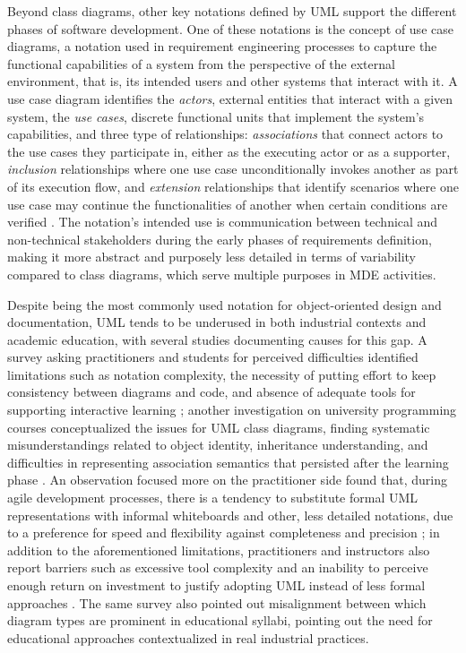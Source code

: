 Beyond class diagrams, other key notations defined by UML support the different phases of software development. One of these notations is the concept of use case diagrams, a notation used in requirement engineering processes to capture the functional capabilities of a system from the perspective of the external environment, that is, its intended users and other systems that interact with it. A use case diagram identifies the \textit{actors}, external entities that interact with a given system, the \textit{use cases}, discrete functional units that implement the system's capabilities, and three type of relationships: \textit{associations} that connect actors to the use cases they participate in, either as the executing actor or as a supporter, \textit{inclusion} relationships where one use case unconditionally invokes another as part of its execution flow, and \textit{extension} relationships that identify scenarios where one use case may continue the functionalities of another when certain conditions are verified \cite{fowler2003uml}. The notation's intended use is communication between technical and non-technical stakeholders during the early phases of requirements definition, making it more abstract and purposely less detailed in terms of variability compared to class diagrams, which serve multiple purposes in MDE activities.

Despite being the most commonly used notation for object-oriented design and documentation, UML tends to be underused in both industrial contexts and academic education, with several studies documenting causes for this gap. A survey asking practitioners and students for perceived difficulties identified limitations such as notation complexity, the necessity of putting effort to keep consistency between diagrams and code, and absence of adequate tools for supporting interactive learning \cite{siau2006identifying}; another investigation on university programming courses conceptualized the issues for UML class diagrams, finding systematic misunderstandings related to object identity, inheritance understanding, and difficulties in representing association semantics that persisted after the learning phase \cite{boustedt2012students}. An observation focused more on the practitioner side found that, during agile development processes, there is a tendency to substitute formal UML representations with informal whiteboards and other, less detailed notations, due to a preference for speed and flexibility against completeness and precision \cite{stettina2012documentation}; in addition to the aforementioned limitations, practitioners and instructors also report barriers such as excessive tool complexity and an inability to perceive enough return on investment to justify adopting UML instead of less formal approaches \cite{oliveirajr2025uml}. The same survey also pointed out misalignment between which diagram types are prominent in educational syllabi, pointing out the need for educational approaches contextualized in real industrial practices. 

